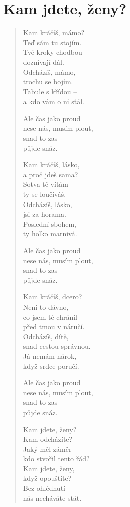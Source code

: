 \section{Kam jdete, ženy?}

\thispagestyle{empty}

\begin{multicols}{2}


\begin{verse}
	
Kam kráčíš, mámo?\\
Teď sám tu stojím.\\
Tvé kroky chodbou\\
doznívají dál.\\
Odcházíš, mámo,\\
trochu se bojím.\\
Tabule s křídou -- \\
a kdo vám o ni stál.

Ale čas jako proud\\
nese nás, musím plout,\\
snad to zas\\
půjde snáz.

Kam kráčíš, lásko,\\
a proč jdeš sama?\\
Sotva tě vítám\\
ty se loučíváš.\\
Odcházíš, lásko,\\
jsi za horama.\\
Poslední sbohem, \\
ty holko marnivá.

Ale čas jako proud\\
nese nás, musím plout,\\
snad to zas\\
půjde snáz.

\columnbreak

Kam kráčíš, dcero?\\
Není to dávno,\\
co jsem tě chránil\\
před tmou v náručí.\\
Odcházíš, dítě,\\
snad cestou správnou.\\
Já nemám nárok,\\
když srdce poručí.

Ale čas jako proud\\
nese nás, musím plout,\\
snad to zas\\
půjde snáz.

Kam jdete, ženy?\\
Kam odcházíte?\\
Jaký měl záměr\\
kdo stvořil tento řád?\\
Kam jdete, ženy,\\
když opouštíte?\\
Bez ohlédnutí\\
nás necháváte stát.

\end{verse}


\end{multicols}